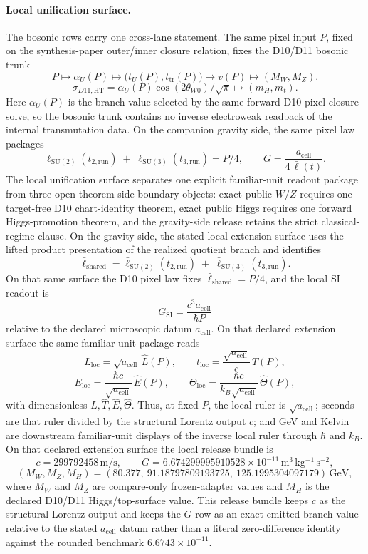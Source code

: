 \documentclass[11pt]{article}
\newcommand{\ellbar}{\bar{\ell}}
\begin{document}
\paragraph{Local unification surface.}
The bosonic rows carry one cross-lane statement. The same pixel input \(P\), fixed on the
synthesis-paper outer/inner closure relation, fixes the
D10/D11 bosonic trunk
\[
P
\longmapsto
\alpha_U(P)
\longmapsto
\bigl(t_U(P),t_{\mathrm{tr}}(P)\bigr)
\longmapsto
v(P)
\longmapsto
\left(M_W,M_Z\right).
\]
\[
\sigma_{D11,\mathrm{HT}}
=
\alpha_U(P)\cos(2\theta_{W0})/\sqrt{\pi}
\longmapsto
\left(m_H,m_t\right).
\]
Here \(\alpha_U(P)\) is the branch value selected by the same forward D10 pixel-closure solve, so
the bosonic trunk contains no inverse electroweak readback of the internal transmutation data.
On the companion gravity side, the same pixel law packages
\[
\ellbar_{\mathrm{SU(2)}}(t_{2,\mathrm{run}})
\;+\;
\ellbar_{\mathrm{SU(3)}}(t_{3,\mathrm{run}})
=
P/4,
\qquad
G=\frac{a_{\mathrm{cell}}}{4\,\ellbar(t)}.
\]
The local unification surface separates one explicit familiar-unit readout package from three
open theorem-side boundary objects: exact public \(W/Z\) requires one target-free D10
chart-identity theorem, exact public Higgs requires one forward Higgs-promotion theorem, and the
gravity-side release retains the strict classical-regime clause.
On the gravity side, the stated local extension surface uses the lifted product presentation of the
realized quotient branch and identifies
\[
\ellbar_{\mathrm{shared}}
=
\ellbar_{\mathrm{SU(2)}}(t_{2,\mathrm{run}})
\;+\;
\ellbar_{\mathrm{SU(3)}}(t_{3,\mathrm{run}}).
\]
On that same surface the D10 pixel law fixes \(\ellbar_{\mathrm{shared}}=P/4\),
and the local SI readout is
\[
G_{\mathrm{SI}}=\frac{c^3 a_{\mathrm{cell}}}{\hbar P}
\]
relative to the declared microscopic datum \(a_{\mathrm{cell}}\). On that declared extension
surface the same familiar-unit package reads
\[
L_{\mathrm{loc}}=\sqrt{a_{\mathrm{cell}}}\,\widehat L(P),
\qquad
t_{\mathrm{loc}}=\frac{\sqrt{a_{\mathrm{cell}}}}{c}\,\widehat T(P),
\]
\[
E_{\mathrm{loc}}=\frac{\hbar c}{\sqrt{a_{\mathrm{cell}}}}\,\widehat E(P),
\qquad
\Theta_{\mathrm{loc}}=\frac{\hbar c}{k_B\sqrt{a_{\mathrm{cell}}}}\,\widehat\Theta(P),
\]
with dimensionless \(\widehat L,\widehat T,\widehat E,\widehat\Theta\). Thus, at fixed \(P\), the
local ruler is \(\sqrt{a_{\mathrm{cell}}}\); seconds are that ruler divided by the structural
Lorentz output \(c\); and GeV and Kelvin are downstream familiar-unit displays of the inverse
local ruler through \(\hbar\) and \(k_B\). On that declared extension
surface the local release bundle is
\[
c=299792458\,\mathrm{m/s},
\qquad
G=6.674299995910528\times10^{-11}\,\mathrm{m^3\,kg^{-1}\,s^{-2}},
\]
\[
(M_W,M_Z,M_H)=
(80.377,\ 91.18797809193725,\ 125.1995304097179)\,\mathrm{GeV},
\]
where \(M_W\) and \(M_Z\) are compare-only frozen-adapter values and \(M_H\) is the declared
D10/D11 Higgs/top-surface value. This release bundle keeps \(c\) as the structural Lorentz output and keeps the \(G\) row as an exact emitted branch
value relative to the stated \(a_{\mathrm{cell}}\) datum rather than a literal zero-difference identity against the rounded benchmark
\(6.6743\times10^{-11}\).
\end{document}
